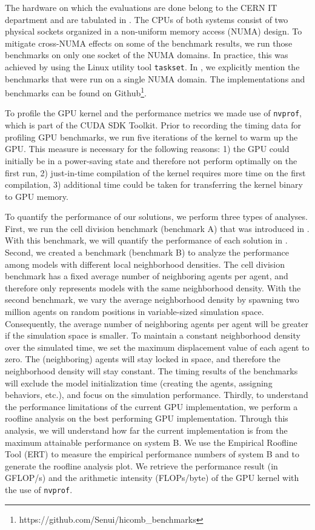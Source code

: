 \documentclass[conference]{IEEEtran}
\begin{document}
\par The hardware on which the evaluations are done belong to the CERN IT department and are tabulated in .
The CPUs of both systems consist of two physical sockets organized in a non-uniform memory access (NUMA) design.
To mitigate cross-NUMA effects on some of the benchmark results, we run those benchmarks on only one socket of the NUMA domains.
In practice, this was achieved by using the Linux utility tool \texttt{taskset}.
In , we explicitly mention the benchmarks that were run on a single NUMA domain.
The implementations and benchmarks can be found on Github\footnote{https://github.com/Senui/hicomb\_benchmarks}.
\par To profile the GPU kernel and the performance metrics we made use of \texttt{nvprof}, which is part of the CUDA SDK Toolkit.
Prior to recording the timing data for profiling GPU benchmarks, we run five iterations of the kernel to warm up the GPU.
This measure is necessary for the following reasons: 1) the GPU could initially be in a power-saving state and therefore not perform optimally on the first run, 2) just-in-time compilation of the kernel requires more time on the first compilation, 3) additional time could be taken for transferring the kernel binary to GPU memory.
\par To quantify the performance of our solutions, we perform three types of analyses.
First, we run the cell division benchmark (benchmark A) that was introduced in .
With this benchmark, we will quantify the performance of each solution in .
Second, we created a benchmark (benchmark B) to analyze the performance among models with different local neighborhood densities.
The cell division benchmark has a fixed average number of neighboring agents per agent, and therefore only represents models with the same neighborhood density.
With the second benchmark, we vary the average neighborhood density by spawning two million agents on random positions in variable-sized simulation space.
Consequently, the average number of neighboring agents per agent will be greater if the simulation space is smaller.
To maintain a constant neighborhood density over the simulated time, we set the maximum displacement value of each agent to zero.
The  (neighboring) agents will stay locked in space, and therefore the neighborhood density will stay constant.
The timing results of the benchmarks will exclude the model initialization time (creating the agents, assigning behaviors, etc.), and focus on the simulation performance.
Thirdly, to understand the performance limitations of the current GPU implementation, we perform a roofline analysis \cite{williams2009roofline} on the best performing GPU implementation.
Through this analysis, we will understand how far the current implementation is from the maximum attainable performance on system B.
We use the Empirical Roofline Tool (ERT) \cite{yang2018empirical} to measure the empirical performance numbers of system B and to generate the roofline analysis plot.
We retrieve the performance result (in GFLOP/s) and the arithmetic intensity (FLOPs/byte) of the GPU kernel with the use of \texttt{nvprof}.
\end{document}
